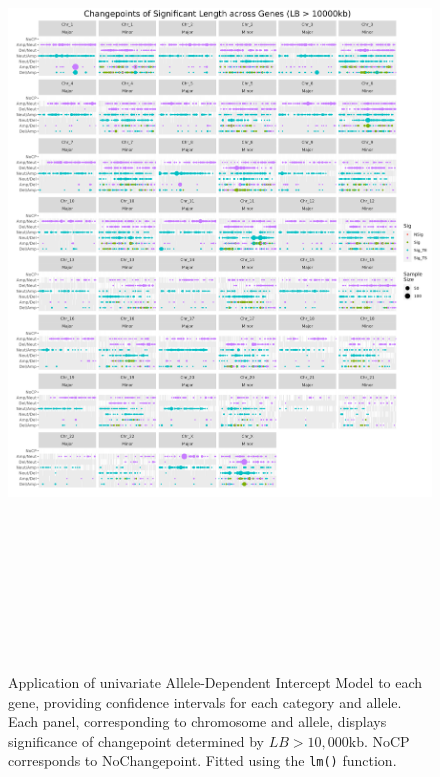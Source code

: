 \begin{figure}[H]
\centering
\includegraphics[width = 1\textwidth, height = 22cm]{../figures/Chapter_6/PerGene_LM_10000_Thesis.png}
\caption[Application of univariate Allele-Dependent Intercept Model to each gene ($LB > 10,000$kb).]{Application of univariate Allele-Dependent Intercept Model to each gene, providing confidence intervals for each category and allele. Each panel, corresponding to chromosome and allele, displays significance of changepoint determined by $LB > 10,000$kb. NoCP corresponds to NoChangepoint. Fitted using the \texttt{lm()} function.}
\label{fig:PerGene_10000_LM}
\end{figure}

